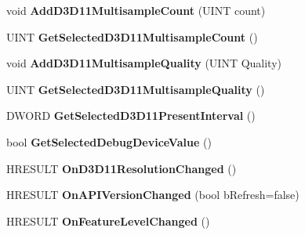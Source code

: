 \begin{DoxyCompactItemize}
\item 
\hypertarget{class_c_d3_d_settings_dlg_a69d7c6adc31c436943f8b4ce109c8d5c}{void {\bfseries Add\+D3\+D11\+Multisample\+Count} (U\+I\+N\+T count)}\label{class_c_d3_d_settings_dlg_a69d7c6adc31c436943f8b4ce109c8d5c}

\item 
\hypertarget{class_c_d3_d_settings_dlg_abaf7141d7ea274556054f06926b6ca89}{U\+I\+N\+T {\bfseries Get\+Selected\+D3\+D11\+Multisample\+Count} ()}\label{class_c_d3_d_settings_dlg_abaf7141d7ea274556054f06926b6ca89}

\item 
\hypertarget{class_c_d3_d_settings_dlg_a13f372a3d09aeb998beffdfb0eeb716f}{void {\bfseries Add\+D3\+D11\+Multisample\+Quality} (U\+I\+N\+T Quality)}\label{class_c_d3_d_settings_dlg_a13f372a3d09aeb998beffdfb0eeb716f}

\item 
\hypertarget{class_c_d3_d_settings_dlg_a2bf174d2f4789fa67e1facec3187a85c}{U\+I\+N\+T {\bfseries Get\+Selected\+D3\+D11\+Multisample\+Quality} ()}\label{class_c_d3_d_settings_dlg_a2bf174d2f4789fa67e1facec3187a85c}

\item 
\hypertarget{class_c_d3_d_settings_dlg_a5e6c72771903068c4b8248154656a2c9}{D\+W\+O\+R\+D {\bfseries Get\+Selected\+D3\+D11\+Present\+Interval} ()}\label{class_c_d3_d_settings_dlg_a5e6c72771903068c4b8248154656a2c9}

\item 
\hypertarget{class_c_d3_d_settings_dlg_aa0451e7928e5dc2c851d13cd9bd3e084}{bool {\bfseries Get\+Selected\+Debug\+Device\+Value} ()}\label{class_c_d3_d_settings_dlg_aa0451e7928e5dc2c851d13cd9bd3e084}

\item 
\hypertarget{class_c_d3_d_settings_dlg_a84c35ff8e6c91732dd77b479aa5b9e0f}{H\+R\+E\+S\+U\+L\+T {\bfseries On\+D3\+D11\+Resolution\+Changed} ()}\label{class_c_d3_d_settings_dlg_a84c35ff8e6c91732dd77b479aa5b9e0f}

\item 
\hypertarget{class_c_d3_d_settings_dlg_a01d0868a498e260cf58ccc9504c4a1bb}{H\+R\+E\+S\+U\+L\+T {\bfseries On\+A\+P\+I\+Version\+Changed} (bool b\+Refresh=false)}\label{class_c_d3_d_settings_dlg_a01d0868a498e260cf58ccc9504c4a1bb}

\item 
\hypertarget{class_c_d3_d_settings_dlg_ac8675f801081c6b257de1ce2bcef24b5}{H\+R\+E\+S\+U\+L\+T {\bfseries On\+Feature\+Level\+Changed} ()}\label{class_c_d3_d_settings_dlg_ac8675f801081c6b257de1ce2bcef24b5}


\end{DoxyCompactItemize}

